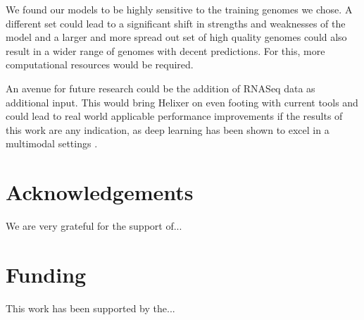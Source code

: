 \documentclass{bioinfo}
\begin{document}
We found our models to be highly sensitive to the training genomes we chose. A different set could lead to a significant shift in strengths and weaknesses of the model and a larger and more spread out set of high quality genomes could also result in a wider range of genomes with decent predictions. For this, more computational resources would be required. 

An avenue for future research could be the addition of RNASeq data as additional input. This would bring Helixer on even footing with current tools and could lead to real world applicable performance improvements if the results of this work are any indication, as deep learning has been shown to excel in a multimodal settings \citep{ching2018opportunities}.

\section*{Acknowledgements}

We are very grateful for the support of...

\section*{Funding}

This work has been supported by the... \vspace*{-12pt}



\end{document}
